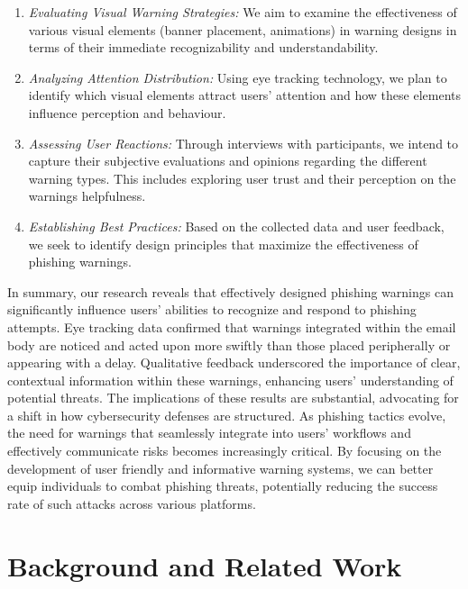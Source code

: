 \documentclass[
  a4paper,  %
  twoside,  %
  bibliography=totoc,
  headsepline,
  cleardoublepage=empty,
  parskip=half,
  draft=false
]{scrbook}
\begin{document}
\begin{enumerate}
    \item \textit{Evaluating Visual Warning Strategies:} We aim to examine the effectiveness of various visual elements (banner placement, animations) in warning designs in terms of their immediate recognizability and understandability.
    \item \textit{Analyzing Attention Distribution:} Using eye tracking technology, we plan to identify which visual elements attract users' attention and how these elements influence perception and behaviour.
    \item \textit{Assessing User Reactions:} Through interviews with participants, we intend to capture their subjective evaluations and opinions regarding the different warning types. This includes exploring user trust and their perception on the warnings helpfulness.
    \item \textit{Establishing Best Practices:} Based on the collected data and user feedback, we seek to identify design principles that maximize the effectiveness of phishing warnings.
\end{enumerate}

In summary, our research reveals that effectively designed phishing warnings can significantly influence users' abilities to recognize and respond to phishing attempts. Eye tracking data confirmed that warnings integrated within the email body are noticed and acted upon more swiftly than those placed peripherally or appearing with a delay. Qualitative feedback underscored the importance of clear, contextual information within these warnings, enhancing users' understanding of potential threats. \newline
The implications of these results are substantial, advocating for a shift in how cybersecurity defenses are structured. As phishing tactics evolve, the need for warnings that seamlessly integrate into users' workflows and effectively communicate risks becomes increasingly critical. By focusing on the development of user friendly and informative warning systems, we can better equip individuals to combat phishing threats, potentially reducing the success rate of such attacks across various platforms. 


\chapter{Background and Related Work}
\label{sec:relatedwork}
\end{document}
